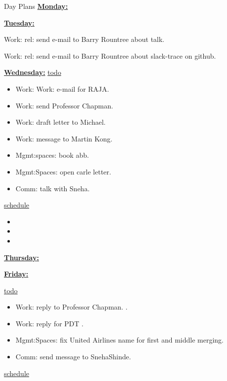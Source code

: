 \begin{frame}[allowframebreaks]{Day Plans}
  \underline{\bf{Monday}:} 

  \underline{\bf{Tuesday}:} 
\item \tiny Work: rel: send e-mail to Barry Rountree about talk. 
\item \tiny Work: rel: send e-mail to Barry Rountree about slack-trace on github. 

  \underline{\bf{Wednesday}:}
\underline{todo}
\begin{itemize}
\item Work: Work: e-mail for RAJA.
\item Work: send Professor Chapman.
\item Work: draft letter to Michael.
\item Work: message to Martin Kong.
\item Mgmt:spaces: book abb. 
\item Mgmt:Spaces: open carle letter. 
\item Comm: talk with Sneha.
\end{itemize} 

\underline{schedule} 
\begin{itemize}
\item 
\item 
\item 
\end{itemize}

\underline{\bf{Thursday}:}

\underline{\bf{Friday}:}

\underline{todo}
\begin{itemize}
\item \tiny Work: reply to Professor Chapman. .
\item \tiny Work: reply for PDT . 


\item \tiny Mgmt:Spaces: fix United Airlines name for first and middle merging.
\item \tiny  Comm: send message to SnehaShinde. 
\end{itemize} 

\underline{schedule}
\end{frame}
